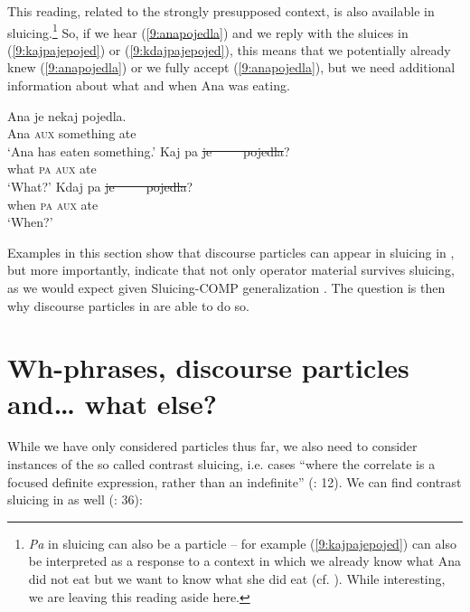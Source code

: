 \documentclass[output=paper,modfonts,newtxmath,hidelinks]{langscibook}
\begin{document}
\noindent This reading, related to the strongly presupposed context, is also available in sluicing.\footnote{\textit{Pa} in sluicing can also be a  particle -- for example (\ref{9:kajpajepojed}) can also be interpreted as a response to a context in which we already know what Ana did not eat but we want to know what she did eat (cf. \citealt{marusicetal2015}). While interesting, we are leaving this reading aside here.} So, if we hear (\ref{9:anapojedla}) and we reply with the sluices in (\ref{9:kajpajepojed}) or (\ref{9:kdajpajepojed}), this means that we potentially already knew (\ref{9:anapojedla}) or we fully accept (\ref{9:anapojedla}), but we need additional information about what and when Ana was eating. 

\begin{exe}
\ex \begin{xlist}
\ex \label{9:anapojedla}
\gll Ana je nekaj pojedla.\\
	Ana \textsc{aux} something ate\\
\trans  `Ana has eaten something.'
\ex \label{9:kajpajepojed}
\gll Kaj pa \sout{je}\sout{\ }\sout{\ }\sout{\ }\sout{\ }\sout{\ }\sout{pojedla}?\\
 		what \textsc{pa} {\textsc{aux} ate}\\
\trans  `What?'
\ex \label{9:kdajpajepojed}
\gll Kdaj pa \sout{je}\sout{\ }\sout{\ }\sout{\ }\sout{\ }\sout{\ }\sout{pojedla}?\\
 		when \textsc{pa} {\textsc{aux} ate} \\
\trans  `When?'
\end{xlist}
\end{exe}

\noindent Examples in this section show that discourse particles can appear in sluicing in , but more importantly, indicate that not only operator material survives sluicing, as we would expect given Sluicing-COMP generalization \citep{merchant2001}. The question is then why discourse particles in  are able to do so.

\section{Wh-phrases, discourse particles and{\dots} what else?}\label{9:s3}

While we have only considered particles thus far, we also need to consider instances of the so called contrast sluicing, i.e. cases ``where the correlate is a focused definite expression, rather than an indefinite'' (\citealt{vicenteoupsluicing}: 12). We can find contrast sluicing in  as well (\citealt{merchant2001}: 36): 
\end{document}
